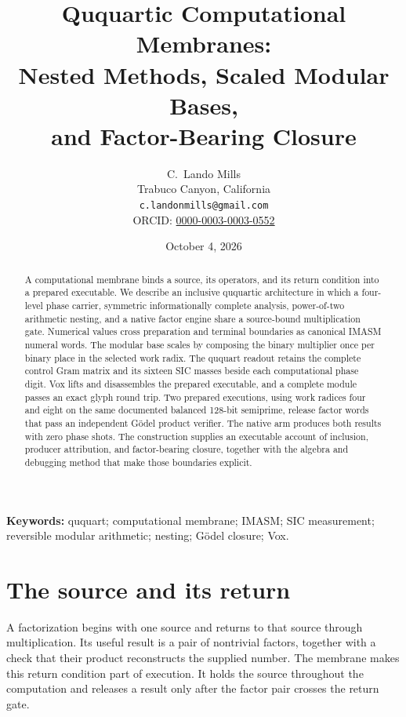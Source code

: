 \documentclass[12pt]{article}
\begin{document}
\title{\textbf{Ququartic Computational Membranes:\\Nested Methods, Scaled Modular Bases,\\and Factor-Bearing Closure}}
\author{C.\ Lando Mills\\
Trabuco Canyon, California\\
\texttt{c.landonmills@gmail.com}\\
ORCID: \href{https://orcid.org/0000-0003-0003-0552}{0000-0003-0003-0552}}
\date{October 4, 2026}
\maketitle

\begin{abstract}
A computational membrane binds a source, its operators, and its return condition into a prepared executable. We describe an inclusive ququartic architecture in which a four-level phase carrier, symmetric informationally complete analysis, power-of-two arithmetic nesting, and a native factor engine share a source-bound multiplication gate. Numerical values cross preparation and terminal boundaries as canonical IMASM numeral words. The modular base scales by composing the binary multiplier once per binary place in the selected work radix. The ququart readout retains the complete control Gram matrix and its sixteen SIC masses beside each computational phase digit. Vox lifts and disassembles the prepared executable, and a complete module passes an exact glyph round trip. Two prepared executions, using work radices four and eight on the same documented balanced 128-bit semiprime, release factor words that pass an independent G\"odel product verifier. The native arm produces both results with zero phase shots. The construction supplies an executable account of inclusion, producer attribution, and factor-bearing closure, together with the algebra and debugging method that make those boundaries explicit.
\end{abstract}

\noindent\textbf{Keywords:} ququart; computational membrane; IMASM; SIC measurement; reversible modular arithmetic; nesting; G\"odel closure; Vox.

\section*{The source and its return}

A factorization begins with one source and returns to that source through multiplication. Its useful result is a pair of nontrivial factors, together with a check that their product reconstructs the supplied number. The membrane makes this return condition part of execution. It holds the source throughout the computation and releases a result only after the factor pair crosses the return gate.
\end{document}
